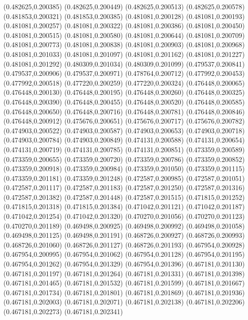 (0.482625,0.200385)
(0.482625,0.200449)
(0.482625,0.200513)
(0.482625,0.200578)
(0.481853,0.200321)
(0.481853,0.200385)
(0.481081,0.200128)
(0.481081,0.200193)
(0.481081,0.200257)
(0.481081,0.200322)
(0.481081,0.200386)
(0.481081,0.200450)
(0.481081,0.200515)
(0.481081,0.200580)
(0.481081,0.200644)
(0.481081,0.200709)
(0.481081,0.200773)
(0.481081,0.200838)
(0.481081,0.200903)
(0.481081,0.200968)
(0.481081,0.201033)
(0.481081,0.201097)
(0.481081,0.201162)
(0.481081,0.201227)
(0.481081,0.201292)
(0.480309,0.201034)
(0.480309,0.201099)
(0.479537,0.200841)
(0.479537,0.200906)
(0.479537,0.200971)
(0.478764,0.200712)
(0.477992,0.200453)
(0.477992,0.200518)
(0.477220,0.200259)
(0.477220,0.200324)
(0.476448,0.200065)
(0.476448,0.200130)
(0.476448,0.200195)
(0.476448,0.200260)
(0.476448,0.200325)
(0.476448,0.200390)
(0.476448,0.200455)
(0.476448,0.200520)
(0.476448,0.200585)
(0.476448,0.200650)
(0.476448,0.200716)
(0.476448,0.200781)
(0.476448,0.200846)
(0.476448,0.200912)
(0.475676,0.200651)
(0.475676,0.200717)
(0.475676,0.200782)
(0.474903,0.200522)
(0.474903,0.200587)
(0.474903,0.200653)
(0.474903,0.200718)
(0.474903,0.200784)
(0.474903,0.200849)
(0.474131,0.200588)
(0.474131,0.200654)
(0.474131,0.200719)
(0.474131,0.200785)
(0.474131,0.200851)
(0.473359,0.200589)
(0.473359,0.200655)
(0.473359,0.200720)
(0.473359,0.200786)
(0.473359,0.200852)
(0.473359,0.200918)
(0.473359,0.200984)
(0.473359,0.201050)
(0.473359,0.201115)
(0.473359,0.201181)
(0.473359,0.201248)
(0.472587,0.200985)
(0.472587,0.201051)
(0.472587,0.201117)
(0.472587,0.201183)
(0.472587,0.201250)
(0.472587,0.201316)
(0.472587,0.201382)
(0.472587,0.201448)
(0.472587,0.201515)
(0.471815,0.201252)
(0.471815,0.201318)
(0.471815,0.201384)
(0.471042,0.201121)
(0.471042,0.201187)
(0.471042,0.201254)
(0.471042,0.201320)
(0.470270,0.201056)
(0.470270,0.201123)
(0.470270,0.201189)
(0.469498,0.200925)
(0.469498,0.200992)
(0.469498,0.201058)
(0.469498,0.201125)
(0.469498,0.201191)
(0.468726,0.200927)
(0.468726,0.200993)
(0.468726,0.201060)
(0.468726,0.201127)
(0.468726,0.201193)
(0.467954,0.200928)
(0.467954,0.200995)
(0.467954,0.201062)
(0.467954,0.201128)
(0.467954,0.201195)
(0.467954,0.201262)
(0.467954,0.201329)
(0.467954,0.201396)
(0.467181,0.201130)
(0.467181,0.201197)
(0.467181,0.201264)
(0.467181,0.201331)
(0.467181,0.201398)
(0.467181,0.201465)
(0.467181,0.201532)
(0.467181,0.201599)
(0.467181,0.201667)
(0.467181,0.201734)
(0.467181,0.201801)
(0.467181,0.201869)
(0.467181,0.201936)
(0.467181,0.202003)
(0.467181,0.202071)
(0.467181,0.202138)
(0.467181,0.202206)
(0.467181,0.202273)
(0.467181,0.202341)
